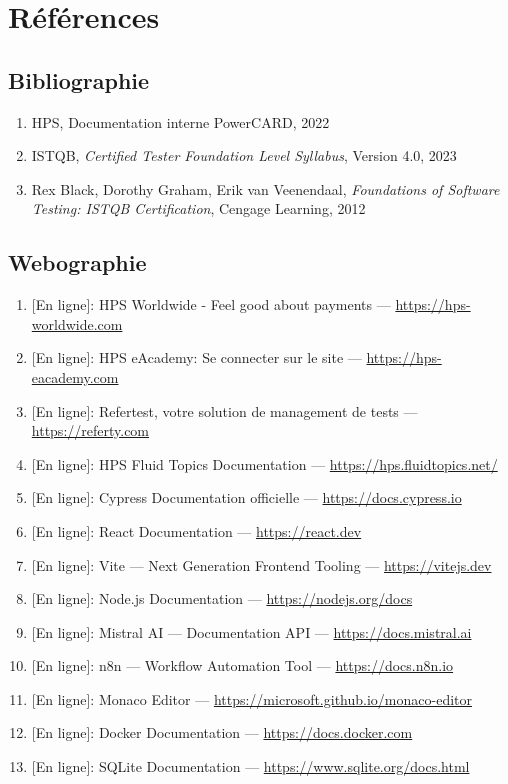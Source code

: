 \newpage
\chapter*{Références}

\section*{Bibliographie}
\begin{enumerate}
\item HPS, Documentation interne PowerCARD, 2022
\item ISTQB, \textit{Certified Tester Foundation Level Syllabus}, Version 4.0, 2023
\item Rex Black, Dorothy Graham, Erik van Veenendaal, \textit{Foundations of Software Testing: ISTQB Certification}, Cengage Learning, 2012
\end{enumerate}

\section*{Webographie}
\begin{enumerate}
\item {[En ligne]}: HPS Worldwide - Feel good about payments --- \url{https://hps-worldwide.com}
\item {[En ligne]}: HPS eAcademy: Se connecter sur le site --- \url{https://hps-eacademy.com}
\item {[En ligne]}: Refertest, votre solution de management de tests --- \url{https://referty.com}
\item {[En ligne]}: HPS Fluid Topics Documentation --- \url{https://hps.fluidtopics.net/}
\item {[En ligne]}: Cypress Documentation officielle --- \url{https://docs.cypress.io}
\item {[En ligne]}: React Documentation --- \url{https://react.dev}
\item {[En ligne]}: Vite --- Next Generation Frontend Tooling --- \url{https://vitejs.dev}
\item {[En ligne]}: Node.js Documentation --- \url{https://nodejs.org/docs}
\item {[En ligne]}: Mistral AI --- Documentation API --- \url{https://docs.mistral.ai}
\item {[En ligne]}: n8n --- Workflow Automation Tool --- \url{https://docs.n8n.io}
\item {[En ligne]}: Monaco Editor --- \url{https://microsoft.github.io/monaco-editor}
\item {[En ligne]}: Docker Documentation --- \url{https://docs.docker.com}
\item {[En ligne]}: SQLite Documentation --- \url{https://www.sqlite.org/docs.html}
\end{enumerate}
